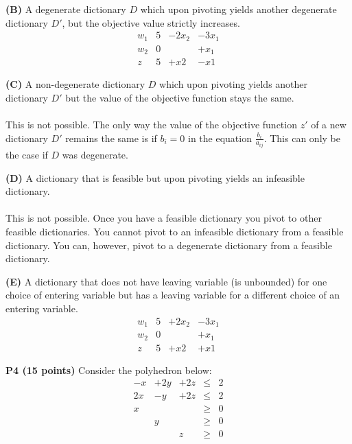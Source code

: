 \documentclass[11pt]{article}
\begin{document}
\medskip

\noindent\textbf{(B)} A degenerate dictionary $D$ which upon pivoting
yields another degenerate dictionary $D'$, but the objective value strictly
increases.
\\
\[\begin{array}{r|cccc}
w_1 & 5 & -2x_2 & -3x_1\\ 
w_2 & 0 && +x_1 \\
\hline
z & 5 & +x2 & -x1
\end{array}\]  

\medskip

\noindent\textbf{(C)} A non-degenerate dictionary $D$ which upon pivoting
yields another dictionary $D'$ but the value of the objective function
stays the same.
\\
\\
This is not possible.  The only way the value of the objective function $z'$ of a new dictionary $D'$ remains the same is if $b_i = 0$ in the equation $\frac{b_i}{a_{ij}}$.  This can only be the case if $D$ was degenerate.

\medskip

\noindent\textbf{(D)} A dictionary that is feasible but upon pivoting
yields an infeasible dictionary.
\\
\\
This is not possible.  Once you have a feasible dictionary you pivot to other feasible dictionaries.  You cannot pivot to an infeasible dictionary from a feasible dictionary.  You can, however, pivot to a degenerate dictionary from a feasible dictionary.

\medskip

\noindent\textbf{(E)} A dictionary that does not have leaving variable
(is unbounded) for one choice of entering variable but has a leaving
variable for a different choice of an entering variable.
\\
\[\begin{array}{r|cccc}
w_1 & 5 & +2x_2 & -3x_1\\ 
w_2 & 0 && +x_1 \\
\hline
z & 5 & +x2 & +x1
\end{array}\] 


\bigskip

\noindent\textbf{P4 (15 points)}  Consider the polyhedron below:
\[ \begin{array}{ccccc}
 -x & + 2 y & + 2z & \leq & 2 \\
2 x & - y & + 2z & \leq & 2 \\
x & & & \geq & 0\\
& y& & \geq & 0 \\
& & z & \geq & 0 \\
\end{array}\]
\end{document}
